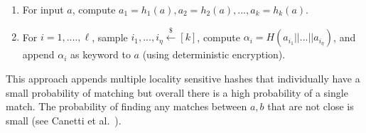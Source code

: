\begin{enumerate}\setlength\itemsep{0em}
\item For input $a$, compute $a_1 = h_1(a), a_2 = h_2(a),..., a_k = h_k(a)$.
\item For $i=1,...., \ell$,
sample $i_1,..., i_\eta\overset{\$}\leftarrow [k]$, compute $\alpha_i =
H(a_{i_1} || ... || a_{i_\eta})$, and append $\alpha_i$ as keyword to $a$
(using deterministic encryption).
\end{enumerate}
\noindent
This approach appends multiple locality sensitive hashes that individually have a small probability of matching but overall there is a high probability of a single match.  The probability of finding any matches between $a,b$ that are not close is small (see Canetti et al.~\cite{EC:CFPRS16}).
%
%
%
%
